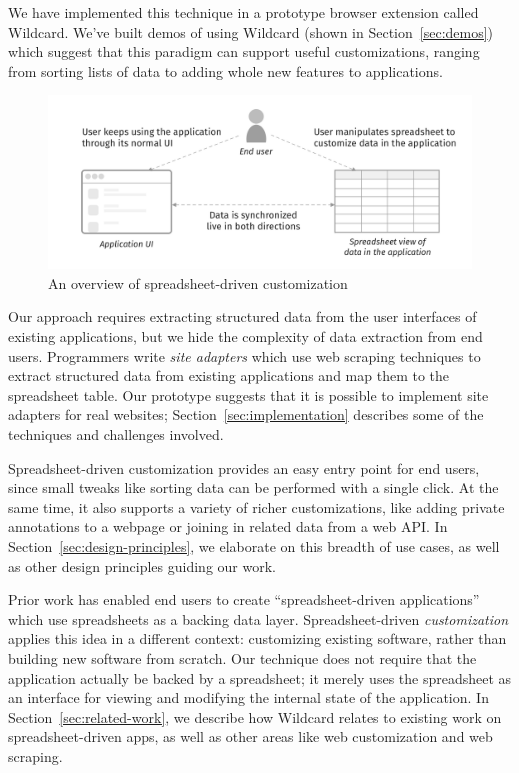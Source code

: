 \documentclass[english,submission]{programming}
\begin{document}
We have implemented this technique in a prototype browser extension
called Wildcard. We've built demos of using Wildcard (shown in
Section~\ref{sec:demos}) which suggest that this paradigm can support
useful customizations, ranging from sorting lists of data to adding
whole new features to applications.

\begin{figure}
\hypertarget{fig:overview}{%
\centering
\includegraphics{media/overview-300dpi.png}
\caption{An overview of spreadsheet-driven
customization}\label{fig:overview}
}
\end{figure}

Our approach requires extracting structured data from the user
interfaces of existing applications, but we hide the complexity of data
extraction from end users. Programmers write \emph{site adapters} which
use web scraping techniques to extract structured data from existing
applications and map them to the spreadsheet table. Our prototype
suggests that it is possible to implement site adapters for real
websites; Section~\ref{sec:implementation} describes some of the
techniques and challenges involved.

Spreadsheet-driven customization provides an easy entry point for end
users, since small tweaks like sorting data can be performed with a
single click. At the same time, it also supports a variety of richer
customizations, like adding private annotations to a webpage or joining
in related data from a web API. In Section~\ref{sec:design-principles},
we elaborate on this breadth of use cases, as well as other design
principles guiding our work.

Prior work \autocite{mccutchen2016,benson2014,chang2014} has enabled end
users to create ``spreadsheet-driven applications'' which use
spreadsheets as a backing data layer. Spreadsheet-driven
\emph{customization} applies this idea in a different context:
customizing existing software, rather than building new software from
scratch. Our technique does not require that the application actually be
backed by a spreadsheet; it merely uses the spreadsheet as an interface
for viewing and modifying the internal state of the application. In
Section~\ref{sec:related-work}, we describe how Wildcard relates to
existing work on spreadsheet-driven apps, as well as other areas like
web customization and web scraping.
\end{document}
